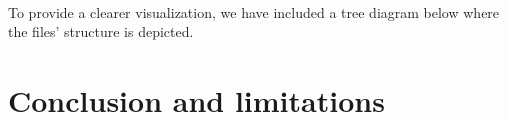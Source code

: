 \documentclass[parskip=full]{report}
\begin{document}
\paragraph{}
To provide a clearer visualization, we have included a tree diagram below where the files' structure is depicted.



\section{Conclusion and limitations}
\end{document}
